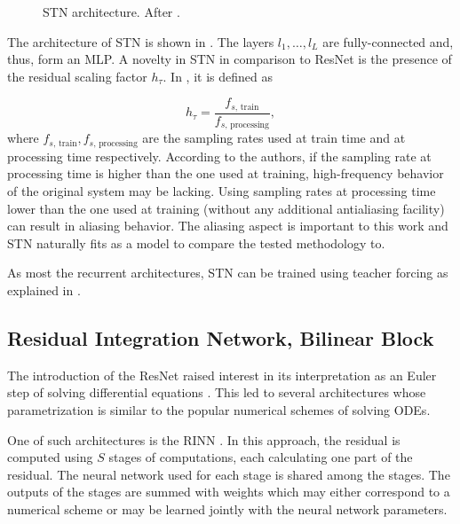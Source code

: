 \begin{figure}
  \centering
  \scalebox{0.7}{}
  \caption{\Acf{STN} architecture. After \cite{Parker2019}.}
  \label{fig:stn}
\end{figure}

The architecture of \ac{STN} is shown in . The layers $l_1, \dots, l_L$ are fully-connected and, thus, form an \ac{MLP}. A novelty in \ac{STN} in comparison to \ac{ResNet} is the presence of the residual scaling factor $h_\tau$. In \cite{Parker2019}, it is defined as

\begin{equation}
  h_\tau = \frac{f_{s\text{, train}}}{f_{s\text{, processing}}},
\end{equation}
where $f_{s\text{, train}}, f_{s\text{, processing}}$ are the sampling rates used at train time and at processing time respectively. According to the authors, if the sampling rate at processing time is higher than the one used at training, high-frequency behavior of the original system may be lacking. Using sampling rates at processing time lower than the one used at training (without any additional antialiasing facility) can result in aliasing behavior. The aliasing aspect is important to this work and \ac{STN} naturally fits as a model to compare the tested methodology to.

As most the recurrent architectures, \ac{STN} can be trained using teacher forcing as explained in .

\subsection*{Residual Integration Network, Bilinear Block}

The introduction of the \ac{ResNet} raised interest in its interpretation as an Euler step of solving differential equations \cite{Chen2018}.
This led to several architectures whose parametrization is similar to the popular numerical schemes of solving \acp{ODE}.

One of such architectures is the \acf{RINN} \cite{Ouala2019}.
In this approach, the residual is computed using $S$ stages of computations, each calculating one part of the residual. The neural network used for each stage is shared among the stages. The outputs of the stages are summed with weights which may either correspond to a numerical scheme or may be learned jointly with the neural network parameters.

